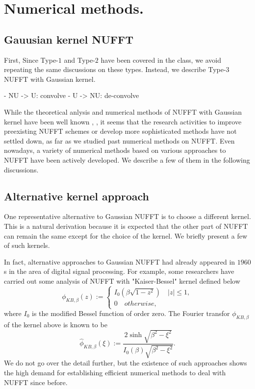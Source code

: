 \section{Numerical methods.}


\subsection{Gauusian kernel NUFFT}

First, 
Since Type-$1$ and Type-$2$ have been covered in the class, we avoid repeating the same discussions on these types.
Instead, we describe Type-$3$ NUFFT with Gaussian kernel.

- NU -> U: convolve
- U -> NU: de-convolve



While the theoretical anlysis and numerical methods of NUFFT with Gaussian kernel have been well known \cite{SISC-1993-Dutt-Rokhlin}, \cite{SIAM-Rev-2004-Greengard}, it seems that the research activities to improve preexisting NUFFT schemes or develop more sophisticated methods have not settled down, as far as we studied past numerical methods on NUFFT.
Even nowadays, a variety of numerical methods based on various approaches to NUFFT have been actively developed.
We describe a few of them in the following discussions.

\subsection{Alternative kernel approach}
One representative alternative to Gaussian NUFFT is to choose a different kernel.
This is a natural derivation because it is expected that the other part of NUFFT can remain the same except for the choice of the kernel.
We briefly present a few of such kernels.

In fact, alternative approaches to Gaussian NUFFT had already appeared in $1960$s in the area of digital signal processing.
For example, some researchers have carried out some analysis of NUFFT with "Kaiser-Bessel" kernel \cite{Book-Kaiser} defined below
\begin{equation}
  \phi_{KB,\beta}(z) := 
  \begin{cases}
    I_{0}\left(\beta\sqrt{1-z^2}\right) \quad |z| \le 1,\\
    0 \quad otherwise,
  \end{cases}
  \label{eq:KB-kernel}
\end{equation}
where $I_{0}$ is the modified Bessel function of order zero.
The Fourier transfor $\phi_{KB,\beta}$ of the kernel above is known to be 
\begin{equation}
  \hat{\phi}_{KB,\beta}(\xi) := 
  \frac{2\sinh\sqrt{\beta^2-\xi^2}}{I_{0}(\beta)\sqrt{\beta^2-\xi^2}}.
  \label{eq:FT-KB-kernel}
\end{equation} 
We do not go over the detail further, but the existence of such approaches shows the high demand for establishing efficient numerical methods to deal with NUFFT since before.

